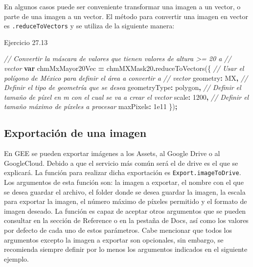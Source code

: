\documentclass[
  12pt,
  letterpaper,
  twoside]{book}
\newenvironment{Shaded}{\begin{snugshade}}{\end{snugshade}}
\newcommand{\CommentTok}[1]{\textcolor[rgb]{0.56,0.35,0.01}{\textit{#1}}}
\newcommand{\DataTypeTok}[1]{\textcolor[rgb]{0.13,0.29,0.53}{#1}}
\newcommand{\DecValTok}[1]{\textcolor[rgb]{0.00,0.00,0.81}{#1}}
\newcommand{\FloatTok}[1]{\textcolor[rgb]{0.00,0.00,0.81}{#1}}
\newcommand{\FunctionTok}[1]{\textcolor[rgb]{0.00,0.00,0.00}{#1}}
\newcommand{\KeywordTok}[1]{\textcolor[rgb]{0.13,0.29,0.53}{\textbf{#1}}}
\newcommand{\NormalTok}[1]{#1}
\newcommand{\OperatorTok}[1]{\textcolor[rgb]{0.81,0.36,0.00}{\textbf{#1}}}
\newcommand{\StringTok}[1]{\textcolor[rgb]{0.31,0.60,0.02}{#1}}
\begin{document}
En algunos casos puede ser conveniente transformar una imagen a un vector, o parte de una imagen a un vector. El método para convertir una imagen en vector es \texttt{.reduceToVectors} y se utiliza de la siguiente manera:

Ejercicio 27.13

\begin{Shaded}
\begin{Highlighting}[]
\CommentTok{// Convertir la máscara de valores que tienen valores de altura \textgreater{}= 20 a }
\CommentTok{// vector}
\KeywordTok{var}\NormalTok{ chmMxMayor20Vec }\OperatorTok{=}\NormalTok{ chmMXMask20}\OperatorTok{.}\FunctionTok{reduceToVectors}\NormalTok{(\{}
     \CommentTok{// Usar el polígono de México para definir el área a convertir a }
     \CommentTok{// vector}
  \DataTypeTok{geometry}\OperatorTok{:}\NormalTok{ MX}\OperatorTok{,}
\CommentTok{// Definir el tipo de geometría que se desea}
  \DataTypeTok{geometryType}\OperatorTok{:} \StringTok{\textquotesingle{}polygon\textquotesingle{}}\OperatorTok{,}
\CommentTok{// Definir el tamaño de píxel en m con el cual se va a crear el vector}
  \DataTypeTok{scale}\OperatorTok{:} \DecValTok{1200}\OperatorTok{,}
\CommentTok{// Definir el tamaño máximo de píxeles a procesar}
  \DataTypeTok{maxPixels}\OperatorTok{:} \FloatTok{1e11}
\NormalTok{\})}\OperatorTok{;}
\end{Highlighting}
\end{Shaded}

\hypertarget{exportaciuxf3n-de-una-imagen}{%
\subsection{Exportación de una imagen}\label{exportaciuxf3n-de-una-imagen}}

En GEE se pueden exportar imágenes a los Assets, al Google Drive o al GoogleCloud. Debido a que el servicio más común será el de drive es el que se explicará. La función para realizar dicha exportación es \texttt{Export.imageToDrive}. Los argumentos de esta función son: la imagen a exportar, el nombre con el que se desea guardar el archivo, el folder donde se desea guardar la imagen, la escala para exportar la imagen, el número máximo de píxeles permitido y el formato de imagen deseado. La función es capaz de aceptar otros argumentos que se pueden consultar en la sección de Reference o en la pestaña de Docs, así como los valores por defecto de cada uno de estos parámetros. Cabe mencionar que todos los argumentos excepto la imagen a exportar son opcionales, sin embargo, se recomienda siempre definir por lo menos los argumentos indicados en el siguiente ejemplo.
\end{document}
